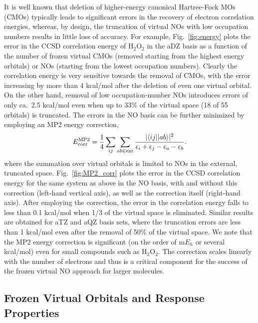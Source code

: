 \documentclass[journal=jpccck,manuscript=article]{achemso}
\begin{document}
It is well known that deletion of higher-energy canonical Hartree-Fock MOs
(CMOs) typically leads to significant errors in the recovery of electron
correlation energies, whereas, by design, the truncation of virtual NOs with
low occupation numbers results in little loss of accuracy.\cite{Landau10,Taube05,Taube08}
For example, Fig.~\ref{fig:energy} plots the error in
the CCSD correlation energy of H$_2$O$_2$ in the aDZ basis as a function of
the number of frozen virtual CMOs (removed starting from the highest energy
orbitals) or NOs (starting from the lowest occupation numbers).  Clearly the
correlation energy is very sensitive towards the removal of CMOs, with the
error increasing by more than 4 kcal/mol after the deletion of even one
virtual orbital.  On the other hand, removal of low occupation-number NOs
introduces errors of only ca.\ 2.5 kcal/mol even when up to 33\% of the
virtual space (18 of 55 orbitals) is truncated.  The errors in
the NO basis can be further minimized by employing an MP2 energy correction,
\begin{equation}
E^{\rm MP2}_{\rm corr} = \frac{1}{4} \sum_{ij} \sum_{ab \in {\rm ext}} \frac{|\langle
ij||ab\rangle|^2}{\epsilon_i + \epsilon_j - \epsilon_a - \epsilon_b}.
\label{Eq:MP2}
\end{equation}
where the summation over virtual orbitals is limited to NOs in the external,
truncated space.  Fig.~\ref{fig:MP2_corr} plots the error in the CCSD
correlation energy for the same system as above in the NO basis, with and
without this correction (left-hand vertical axis), as well as the correction
itself (right-hand axis).  After employing the correction, the error in the
correlation energy falls to less than 0.1 kcal/mol when 1/3 of the virtual
space is eliminated. Similar results are obtained for aTZ and aQZ basis sets,
where the truncation errors are less than 1 kcal/mol even after the removal of 50\%
of the virtual space. We note that the MP2 energy correction is significant 
(on the order of m$E_h$ or several kcal/mol) even for small compounds such as 
H$_2$O$_2$.  The correction scales linearly with the number of electrons and 
thus is a critical component for the success of the frozen virtual NO approach 
for larger molecules.

\subsection{Frozen Virtual Orbitals and Response Properties}
\end{document}
